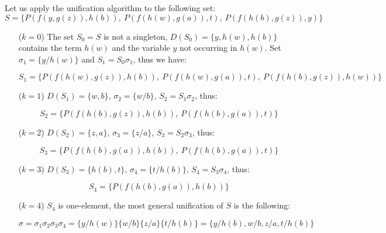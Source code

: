 \begin{example}
Let us apply the unification algorithm to the following set: 
$$
S=\{P(f(y,g(z)),h(b)),\ P(f(h(w),g(a)),t),\ P(f(h(b),g(z)),y)\}
$$
\begin{itemize}
    \item[($k=0$)] The set $S_0=S$ is not a singleton, $D(S_0)=\{y,h(w),h(b)\}$ contains the term $h(w)$ and the variable $y$ not occurring in $h(w)$. Set $\sigma_1=\{y/h(w)\}$ and $S_1=S_0\sigma_1$, thus we have:
    
    $$S_1=\{P(f(h(w),g(z)),h(b)),\ P(f(h(w),g(a)),t),\ P(f(h(b),g(z)),h(w))\}$$

    \item[($k=1$)] $D(S_1)=\{w,b\}$, $\sigma_2=\{w/b\}$, $S_2=S_1\sigma_2$, thus:
    
    $$S_2=\{P(f(h(b),g(z)),h(b)),\ P(f(h(b),g(a)),t)\}$$
        
    \item[($k=2$)] $D(S_2)=\{z,a\}$, $\sigma_3=\{z/a\}$, $S_3=S_2\sigma_3$, thus:
    
    $$S_3=\{P(f(h(b),g(a)),h(b)),\ P(f(h(b),g(a)),t)\}$$

    \item[($k=3$)] $D(S_3)=\{h(b),t\}$, $\sigma_4=\{t/h(b)\}$, $S_4=S_3\sigma_4$, thus:
    
    $$S_4=\{P(f(h(b),g(a)),h(b))\}$$

    \item[($k=4$)] $S_4$ is one-element, the most general unification of $S$ is the following:
    
    $$
    \sigma=\sigma_1\sigma_2\sigma_3\sigma_4=\{y/h(w)\}\{w/b\}\{z/a\}\{t/h(b)\}=\{y/h(b),w/b,z/a,t/h(b)\}
    $$
\end{itemize}     
\end{example}

